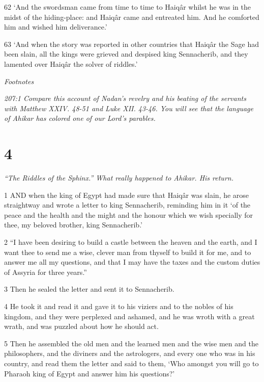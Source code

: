 \par 62 ‘And the swordsman came from time to time to Haiqâr whilst he was in the midst of the hiding-place: and Haiqâr came and entreated him. And he comforted him and wished him deliverance.’

\par 63 ‘And when the story was reported in other countries that Haiqâr the Sage had been slain, all the kings were grieved and despised king Sennacherib, and they lamented over Haiqâr the solver of riddles.’

\par \textit{Footnotes}

\par \textit{207:1 Compare this account of Nadan's revelry and his beating of the servants with Matthew XXIV. 48-51 and Luke XII. 43-46. You will see that the language of Ahikar has colored one of our Lord's parables.}

\chapter{4}

\par \textit{“The Riddles of the Sphinx.” What really happened to Ahikar. His return.}

\par 1 AND when the king of Egypt had made sure that Haiqâr was slain, he arose straightway and wrote a letter to king Sennacherib, reminding him in it ‘of the peace and the health and the might and the honour which we wish specially for thee, my beloved brother, king Sennacherib.’

\par 2 “I have been desiring to build a castle between the heaven and the earth, and I want thee to send me a wise, clever man from thyself to build it for me, and to answer me all my questions, and that I may have the taxes and the custom duties of Assyria for three years.”

\par 3 Then he sealed the letter and sent it to Sennacherib.

\par 4 He took it and read it and gave it to his viziers and to the nobles of his kingdom, and they were perplexed and ashamed, and he was wroth with a great wrath, and was puzzled about how he should act.

\par 5 Then he assembled the old men and the learned men and the wise men and the philosophers, and the diviners and the astrologers, and every one who was in his country, and read them the letter and said to them, ‘Who amongst you will go to Pharaoh king of Egypt and answer him his questions?’

